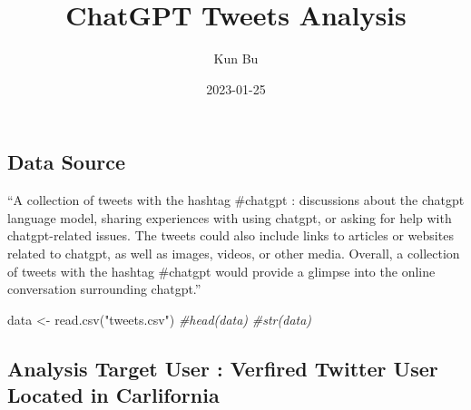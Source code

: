 \documentclass[
]{article}
\title{ChatGPT Tweets Analysis}
\author{Kun Bu}
\date{2023-01-25}
\newenvironment{Shaded}{\begin{snugshade}}{\end{snugshade}}
\newcommand{\CommentTok}[1]{\textcolor[rgb]{0.56,0.35,0.01}{\textit{#1}}}
\newcommand{\FunctionTok}[1]{\textcolor[rgb]{0.00,0.00,0.00}{#1}}
\newcommand{\NormalTok}[1]{#1}
\newcommand{\OtherTok}[1]{\textcolor[rgb]{0.56,0.35,0.01}{#1}}
\newcommand{\SpecialCharTok}[1]{\textcolor[rgb]{0.00,0.00,0.00}{#1}}
\newcommand{\StringTok}[1]{\textcolor[rgb]{0.31,0.60,0.02}{#1}}
\begin{document}
\maketitle

\hypertarget{data-source}{%
\subsection{Data Source}\label{data-source}}

``A collection of tweets with the hashtag \#chatgpt : discussions about
the chatgpt language model, sharing experiences with using chatgpt, or
asking for help with chatgpt-related issues. The tweets could also
include links to articles or websites related to chatgpt, as well as
images, videos, or other media. Overall, a collection of tweets with the
hashtag \#chatgpt would provide a glimpse into the online conversation
surrounding chatgpt.''

\begin{Shaded}
\begin{Highlighting}[]
\NormalTok{data }\OtherTok{\textless{}{-}} \FunctionTok{read.csv}\NormalTok{(}\StringTok{"tweets.csv"}\NormalTok{)}
\CommentTok{\#head(data)}
\CommentTok{\#str(data)}
\end{Highlighting}
\end{Shaded}

\hypertarget{analysis-target-user-verfired-twitter-user-located-in-carlifornia}{%
\subsection{Analysis Target User : Verfired Twitter User Located in
Carlifornia}\label{analysis-target-user-verfired-twitter-user-located-in-carlifornia}}

\begin{Shaded}
\end{Shaded}
\end{document}
